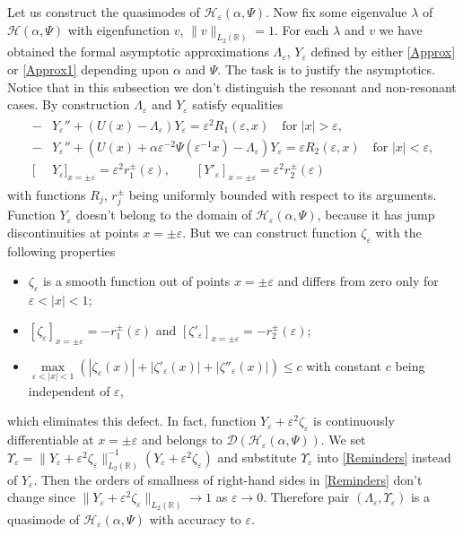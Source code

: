 \documentclass[11pt,english]{amsart}
\begin{document}
Let us construct the quasimodes of $\mathcal{H}_{\varepsilon}(\alpha,\Psi)$.
Now fix some eigenvalue $\lambda$ of  $\mathcal{H}(\alpha,\Psi)$ with eigenfunction $v$, $\|v\|_{L_2(\mathbb{R})}=1$. For each $\lambda$ and $v$ we have obtained the formal asymptotic approximations
$\Lambda_\varepsilon$, $Y_\varepsilon$ defined by either \eqref{Approx} or \eqref{Approx1} depending upon  $\alpha$ and $\Psi$.
The task is  to justify the asymptotics.
Notice that in this subsection we don't distinguish the resonant and non-resonant  cases.
By construction $\Lambda_\varepsilon$ and $Y_\varepsilon$ satisfy equalities
\begin{align}
\begin{aligned}\label{Reminders}
    -&Y_\varepsilon''+(U(x)-\Lambda_\varepsilon) Y_\varepsilon=\varepsilon^2 R_1(\varepsilon,x)\quad \text{for } {\left\vert{x}\right\vert}>\varepsilon,\\
    -&Y_\varepsilon''+(U(x)+\alpha \varepsilon^{-2}\Psi(\varepsilon^{-1}x)-\Lambda_\varepsilon) Y_\varepsilon=\varepsilon R_2(\varepsilon,x)\quad \text{for }{\left\vert{x}\right\vert}<\varepsilon,\\
    [&Y_\varepsilon]_{x=\pm\varepsilon}=\varepsilon^2 r_1^\pm(\varepsilon),\qquad [Y'_\varepsilon]_{x=\pm\varepsilon}=\varepsilon^2 r_2^\pm(\varepsilon)
\end{aligned}
\end{align}
with  functions $R_j$, $r_j^\pm$ being uniformly bounded with respect to its arguments.
Function $Y_\varepsilon$ doesn't belong to the domain of $\mathcal{H}_{\varepsilon}(\alpha,\Psi)$, because it has jump discontinuities  at points $x=\pm\varepsilon$.  But we can construct function $\zeta_\varepsilon$ with the following properties
\begin{itemize}
  \item $\zeta_\varepsilon$ is a smooth function out of points $x=\pm\varepsilon$ and differs from zero only for $\varepsilon<|x|<1$;
  \item $[\zeta_\varepsilon]_{x=\pm\varepsilon}=-r_1^\pm(\varepsilon)$ and $[\zeta'_\varepsilon]_{x=\pm\varepsilon}=-r_2^\pm(\varepsilon)$;
  \item $\max\limits_{\varepsilon<|x|<1}(|\zeta_\varepsilon(x)|+|\zeta'_\varepsilon(x)|+|\zeta''_\varepsilon(x)|)\leq c$ with constant $c$ being independent of $\varepsilon$,
\end{itemize}
which eliminates this defect. In fact, function $Y_\varepsilon+\varepsilon^2\zeta_\varepsilon$ is continuously differentiable at $x=\pm\varepsilon$ and belongs to $\mathcal{D}(\mathcal{H}_{\varepsilon}(\alpha,\Psi))$. We set $\Upsilon_\varepsilon=\|Y_\varepsilon+
\varepsilon^2\zeta_\varepsilon\|^{-1}_{L_2(\mathbb{R})}(Y_\varepsilon+\varepsilon^2\zeta_\varepsilon)$
and substitute $\Upsilon_\varepsilon$ into \eqref{Reminders} instead of $Y_\varepsilon$. Then
the orders of smallness of  right-hand sides in \eqref{Reminders} don't  change since $\|Y_\varepsilon+
\varepsilon^2\zeta_\varepsilon\|_{L_2(\mathbb{R})}\to 1$ as $\varepsilon\to 0$. Therefore  pair $(\Lambda_\varepsilon, \Upsilon_\varepsilon)$ is a quasimode of  $\mathcal{H}_{\varepsilon}(\alpha,\Psi)$ with accuracy to $\varepsilon$.
\end{document}
